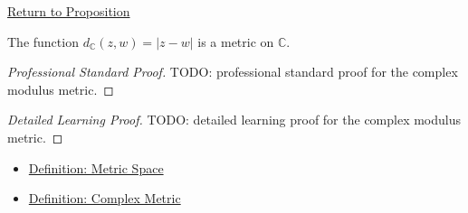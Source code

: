 \newpage
{}
\label{prf:complex-modulus-metric}

\begin{remark*}[Return]
\hyperref[prop:complex-modulus-metric]{Return to Proposition}
\end{remark*}

\begin{proposition*}
The function \(d_{\mathbb{C}}(z,w)=|z-w|\) is a metric on \(\mathbb{C}\).
\end{proposition*}

\begin{proof}[Professional Standard Proof]
\LRAProofBodyStart
TODO: professional standard proof for the complex modulus metric.
\end{proof}

\begin{proof}[Detailed Learning Proof]
\LRAProofBodyStart
TODO: detailed learning proof for the complex modulus metric.
\end{proof}

\begin{remark*}
\end{remark*}

\begin{dependencies}
\begin{itemize}
  \item \hyperref[def:metric-space]{Definition: Metric Space}
  \item \hyperref[def:complex-metric]{Definition: Complex Metric}
\end{itemize}
\end{dependencies}

\clearpage
